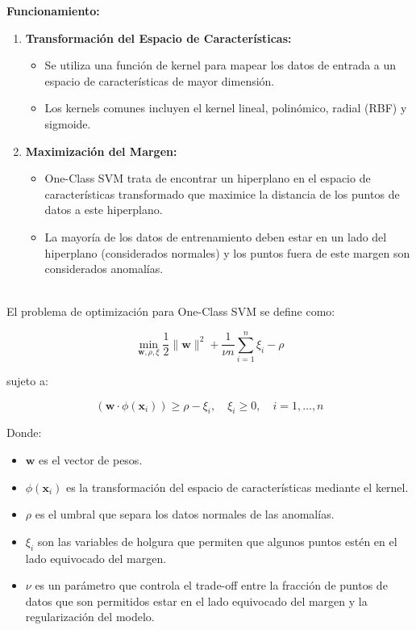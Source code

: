 \textbf{Funcionamiento:}

\begin{enumerate}
    \item \textbf{Transformación del Espacio de Características:}
    \begin{itemize}
        \item Se utiliza una función de kernel para mapear los datos de entrada a un espacio de características de mayor dimensión.
        \item Los kernels comunes incluyen el kernel lineal, polinómico, radial (RBF) y sigmoide.
    \end{itemize}

    \item \textbf{Maximización del Margen:}
    \begin{itemize}
        \item One-Class SVM trata de encontrar un hiperplano en el espacio de características transformado que maximice la distancia de los puntos de datos a este hiperplano.
        \item La mayoría de los datos de entrenamiento deben estar en un lado del hiperplano (considerados normales) y los puntos fuera de este margen son considerados anomalías.
    \end{itemize}
\end{enumerate}

 \\

El problema de optimización para One-Class SVM se define como:

\[ \min_{\mathbf{w}, \rho, \xi} \frac{1}{2} \|\mathbf{w}\|^2 + \frac{1}{\nu n} \sum_{i=1}^{n} \xi_i - \rho \]

sujeto a:

\[ (\mathbf{w} \cdot \phi(\mathbf{x}_i)) \geq \rho - \xi_i, \quad \xi_i \geq 0, \quad i = 1, \ldots, n \]

Donde:
\begin{itemize}
    \item \( \mathbf{w} \) es el vector de pesos.
    \item \( \phi(\mathbf{x}_i) \) es la transformación del espacio de características mediante el kernel.
    \item \( \rho \) es el umbral que separa los datos normales de las anomalías.
    \item \( \xi_i \) son las variables de holgura que permiten que algunos puntos estén en el lado equivocado del margen.
    \item \( \nu \) es un parámetro que controla el trade-off entre la fracción de puntos de datos que son permitidos estar en el lado equivocado del margen y la regularización del modelo.
\end{itemize}


